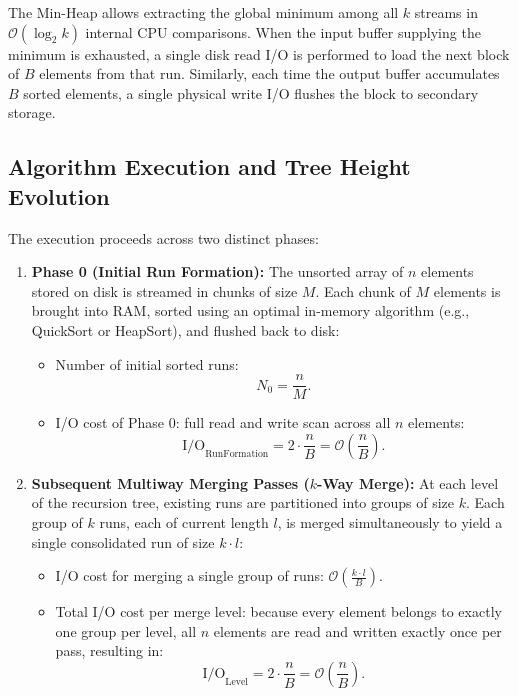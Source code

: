 The Min-Heap allows extracting the global minimum among all $k$ streams in $\mathcal{O}(\log_2 k)$ internal CPU comparisons. When the input buffer supplying the minimum is exhausted, a single disk read I/O is performed to load the next block of $B$ elements from that run. Similarly, each time the output buffer accumulates $B$ sorted elements, a single physical write I/O flushes the block to secondary storage.

\subsection{Algorithm Execution and Tree Height Evolution}
\label{subsec:multiway-dynamics}

The execution proceeds across two distinct phases:

\begin{enumerate}
  \item \textbf{Phase 0 (Initial Run Formation):}
  The unsorted array of $n$ elements stored on disk is streamed in chunks of size $M$. Each chunk of $M$ elements is brought into RAM, sorted using an optimal in-memory algorithm (e.g., QuickSort or HeapSort), and flushed back to disk:
  \begin{itemize}
    \item Number of initial sorted runs:
    \begin{equation}
      N_0 = \frac{n}{M}.
    \end{equation}
    \item I/O cost of Phase 0: full read and write scan across all $n$ elements:
    \begin{equation}
      \mathrm{I/O}_{\text{RunFormation}} = 2 \cdot \frac{n}{B} = \mathcal{O}\left(\frac{n}{B}\right).
    \end{equation}
  \end{itemize}

  \item \textbf{Subsequent Multiway Merging Passes ($k$-Way Merge):}
  At each level of the recursion tree, existing runs are partitioned into groups of size $k$. Each group of $k$ runs, each of current length $l$, is merged simultaneously to yield a single consolidated run of size $k \cdot l$:
  \begin{itemize}
    \item I/O cost for merging a single group of runs: $\mathcal{O}\left(\frac{k \cdot l}{B}\right)$.
    \item Total I/O cost per merge level: because every element belongs to exactly one group per level, all $n$ elements are read and written exactly once per pass, resulting in:
    \begin{equation}
      \mathrm{I/O}_{\text{Level}} = 2 \cdot \frac{n}{B} = \mathcal{O}\left(\frac{n}{B}\right).
    \end{equation}
  \end{itemize}
\end{enumerate}

